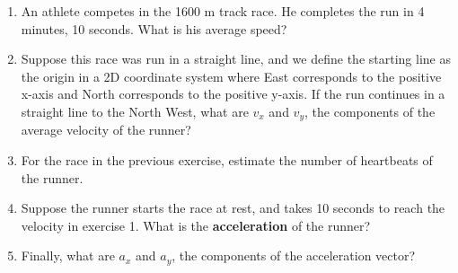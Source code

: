 \documentclass{article}
\begin{document}
\begin{enumerate}
\item An athlete competes in the 1600 m track race.  He completes the run in 4 minutes, 10 seconds.  What is his average speed? \\ \vspace{0.25cm}
\item Suppose this race was run in a straight line, and we define the starting line as the origin in a 2D coordinate system where East corresponds to the positive x-axis and North corresponds to the positive y-axis.  If the run continues in a straight line to the North West, what are $v_x$ and $v_y$, the components of the average velocity of the runner? \\ \vspace{1cm}
\item For the race in the previous exercise, estimate the number of heartbeats of the runner. \\ \vspace{1cm}
\item Suppose the runner starts the race at rest, and takes 10 seconds to reach the velocity in exercise 1.  What is the \textbf{acceleration} of the runner? \\ \vspace{1cm}
\item Finally, what are $a_x$ and $a_y$, the components of the acceleration vector?
\end{enumerate}
\end{document}
